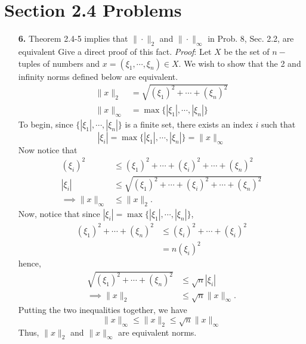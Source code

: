 \documentclass{article}
\begin{document}
\section*{Section 2.4 Problems}
\begin{itemize}
    \item[\textbf{6.}] Theorem 2.4-5 implies that $\|\cdot\|_2$ and $\|\cdot\|_{\infty}$ in Prob. 8, Sec. 2.2, are equivalent Give a direct proof of this fact.
    \newline\newline
    \textit{Proof}: Let $X$ be the set of $n-$tuples of numbers and $x = (\xi_1, \cdots, \xi_n) \in X$. We wish to show that the 2 and infinity norms defined below are equivalent.
    \begin{align*}
        \|x\|_2 &= \sqrt{(\xi_1)^2 + \cdots + (\xi_n)^2}\\
        \|x\|_{\infty} &= \max\{|\xi_1|, \cdots, |\xi_n|\}
    \end{align*}
    To begin, since $\{|\xi_1|, \cdots, |\xi_n|\}$ is a finite set, there exists an index $i$ such that 
    \[|\xi_i| = \max\{|\xi_1|,\cdots, |\xi_n|\} = \|x\|_{\infty}\]
    Now notice that
    \begin{align*}
        (\xi_i)^2 &\leq (\xi_1)^2 + \cdots + (\xi_i)^2 + \cdots + (\xi_n)^2\\
        |\xi_i| &\leq \sqrt{(\xi_1)^2 + \cdots + (\xi_i)^2 + \cdots + (\xi_n)^2}\\
        \implies \|x\|_{\infty} &\leq \|x\|_2.
    \end{align*}
    Now, notice that since $|\xi_i| = \max\{|\xi_1|, \cdots, |\xi_n|\}$, 
    \begin{align*}
        (\xi_1)^2 + \cdots + (\xi_n)^2 &\leq (\xi_i)^2 + \cdots + (\xi_i)^2\\
        &= n(\xi_i)^2
    \end{align*}
    hence,
    \begin{align*}
        \sqrt{(\xi_1)^2 + \cdots + (\xi_n)^2} &\leq \sqrt{n}|\xi_i|\\
        \implies \|x\|_2 &\leq \sqrt{n}\|x\|_{\infty}.
    \end{align*}
    Putting the two inequalities together, we have
    \[\|x\|_{\infty} \leq \|x\|_2 \leq \sqrt{n}\|x\|_{\infty}\]
    Thus, $\|x\|_2$ and $\|x\|_{\infty}$ are equivalent norms.
    
\end{itemize}
\end{document}
